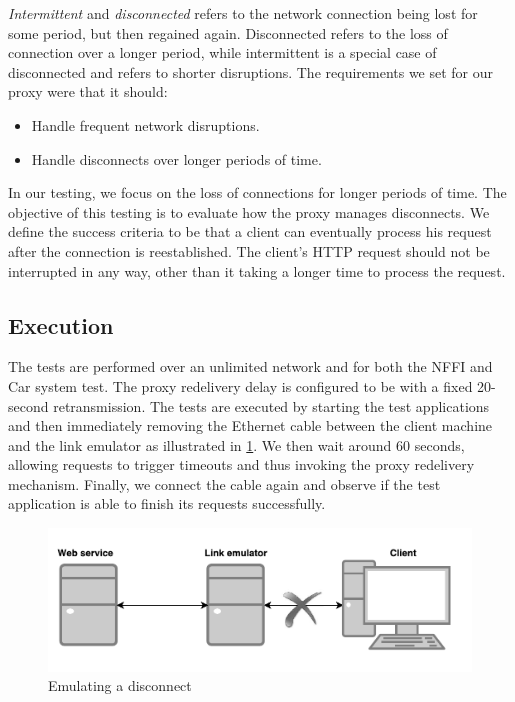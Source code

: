 \textit{Intermittent} and \textit{disconnected} refers to the network connection
being lost for some period, but then regained again. Disconnected refers to the loss
of connection over a longer period, while intermittent is a special case of
disconnected and refers to shorter disruptions. The requirements we set for our
proxy were that it should:

\begin{itemize}

    \item Handle frequent network disruptions.
    \item Handle disconnects over longer periods of time.

\end{itemize}



In our testing, we focus on the loss of connections for longer periods of time.
The objective of this testing is to evaluate how the proxy manages disconnects.
We define the success criteria to be that a client can eventually process his
request after the connection is reestablished. The client's HTTP request should
not be interrupted in any way, other than it taking a longer time to process the
request.

\subsection{Execution}

 The tests are performed over an unlimited network and for both the NFFI and Car
 system test. The proxy redelivery delay is configured to be with a fixed
 20-second retransmission. The tests are executed by starting the test
 applications and then immediately removing the Ethernet cable between the
 client machine and the link emulator as illustrated in
 \cref{figure-testing-disconncted}. We then wait around 60 seconds, allowing
 requests to trigger timeouts and thus invoking the proxy redelivery mechanism.
 Finally, we connect the cable again and observe if the test application is able
 to finish its requests successfully.

 \begin{figure}[h]
 \includegraphics[width=\textwidth]{images/testing_disconnected.png}
 \caption{Emulating a disconnect}
 \label{figure-testing-disconncted}
 \end{figure}


